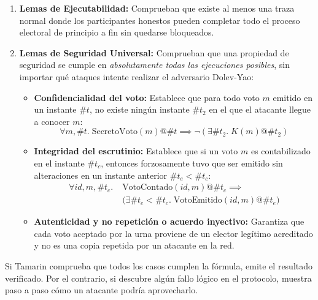 \begin{enumerate}
	\item \textbf{Lemas de Ejecutabilidad:} Comprueban que existe al menos una traza normal donde los participantes honestos pueden completar todo el proceso electoral de principio a fin sin quedarse bloqueados.

	\item \textbf{Lemas de Seguridad Universal:} Comprueban que una propiedad de seguridad se cumple en \textit{absolutamente todas las ejecuciones posibles}, sin importar qué ataques intente realizar el adversario Dolev-Yao:
	\begin{itemize}
		\item \textbf{Confidencialidad del voto:} Establece que para todo voto $m$ emitido en un instante $\#t$, no existe ningún instante $\#t_2$ en el que el atacante llegue a conocer $m$:
		\begin{equation}
			\forall m, \#t. \; \text{SecretoVoto}(m) @ \#t \implies \neg (\exists \#t_2. \; K(m) @ \#t_2)
		\end{equation}

		\item \textbf{Integridad del escrutinio:} Establece que si un voto $m$ es contabilizado en el instante $\#t_c$, entonces forzosamente tuvo que ser emitido sin alteraciones en un instante anterior $\#t_e < \#t_c$:
		\begin{equation}
		\begin{split}
			\forall id, m, \#t_c. \; &\text{VotoContado}(id, m) @ \#t_c \implies \\
			&\big(\exists \#t_e < \#t_c. \; \text{VotoEmitido}(id, m) @ \#t_e\big)
		\end{split}
		\end{equation}

		\item \textbf{Autenticidad y no repetición o acuerdo inyectivo:} Garantiza que cada voto aceptado por la urna proviene de un elector legítimo acreditado y no es una copia repetida por un atacante en la red.
	\end{itemize}
\end{enumerate}

Si Tamarin comprueba que todos los casos cumplen la fórmula, emite el resultado verificado. Por el contrario, si descubre algún fallo lógico en el protocolo, muestra paso a paso cómo un atacante podría aprovecharlo.
